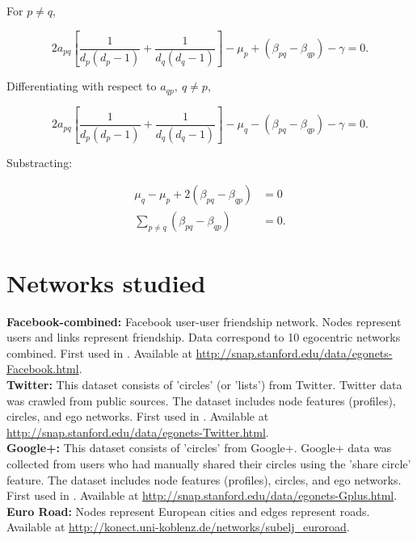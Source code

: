 \documentclass{article}
\begin{document}
For $p\neq q$,

\begin{equation}
    2 a_{pq}\left[\dfrac{1}{d_p (d_p - 1)} + \dfrac{1}{d_q (d_q - 1)} \right]- \mu_p + (\beta_{pq} - \beta_{qp}) - \gamma = 0.
\end{equation}

Differentiating with respect to $a_{qp},\: q\neq p$,

\begin{equation}
    2 a_{pq}\left[\dfrac{1}{d_p (d_p - 1)} + \dfrac{1}{d_q (d_q - 1)} \right]- \mu_q - (\beta_{pq} - \beta_{qp}) - \gamma = 0.
\end{equation}

Substracting:

\begin{align}
    \mu_q - \mu_p + 2 (\beta_{pq} - \beta_{qp}) &= 0 \nonumber \\
    \sum_{p\neq q}(\beta_{pq} - \beta_{qp}) &= 0.
\end{align}

\section{Networks studied} \label{app:NetworksStudied}

\textbf{Facebook-combined:} Facebook user-user friendship network. Nodes represent users and links represent friendship. Data correspond to 10 egocentric networks combined. First used in \cite{Leskovec2012LearningNetworks}. Available at \url{http://snap.stanford.edu/data/egonets-Facebook.html}.\\

\textbf{Twitter:} This dataset consists of 'circles' (or 'lists') from Twitter. Twitter data was crawled from public sources. The dataset includes node features (profiles), circles, and ego networks.  First used in \cite{Leskovec2012LearningNetworks}. Available at \url{http://snap.stanford.edu/data/egonets-Twitter.html}.\\

\textbf{Google+:} This dataset consists of 'circles' from Google+. Google+ data was collected from users who had manually shared their circles using the 'share circle' feature. The dataset includes node features (profiles), circles, and ego networks. First used in \cite{Leskovec2012LearningNetworks}. Available at \url{http://snap.stanford.edu/data/egonets-Gplus.html}.
\\

\textbf{Euro Road:} Nodes represent European cities and edges represent roads. Available at \url{http://konect.uni-koblenz.de/networks/subelj_euroroad}.
\\
\end{document}
